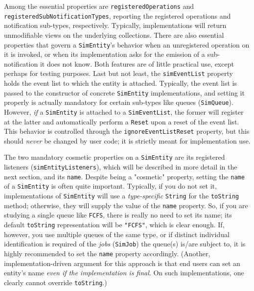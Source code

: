 Among the essential properties are
  \lstinline|registeredOperations|
  and
  \lstinline|registeredSubNotificationTypes|,
  reporting the registered operations and notification sub-types,
  respectively.
Typically,
  implementations will return unmodifiable views
  on the underlying collections.
There are also essential properties that govern a
  \lstinline|SimEntity|'s behavior when an
  unregistered operation on it is invoked,
  or when its implementation asks for the emission
  of a sub-notification it does not know.
Both features are of little practical use,
  except perhaps for testing purposes.
Last but not least,
  the \lstinline|simEventList| property holds
  the event list to which the entity is attached.
Typically,
  the event list is passed to the constructor
  of concrete \lstinline|SimEntity| implementations,
  and setting it properly is actually mandatory
  for certain sub-types
  like queues (\lstinline|SimQueue|).
However, {\em if\/} a \lstinline|SimEntity| is attached to a
  \lstinline|SimEventList|,
  the former will register at the latter
  and automatically perform a \lstinline|Reset|
  upon a reset of the event list.
This behavior
  is controlled through the \lstinline|ignoreEventListReset|
  property, but this should {\em never\/}
  be changed by user code; it is strictly meant for
  implementation use.
  
The two mandatory cosmetic properties on a \lstinline|SimEntity|
  are its registered listeners (\lstinline|simEntityListeners|),
  which will be described in more detail in the next section,
  and its \lstinline|name|.
Despite being a "cosmetic" property,
  setting the \lstinline|name|
  of a \lstinline|SimEntity|
  is often quite important.
Typically,
  if you do not set it,
  implementations of \lstinline|SimEntity|
  will use a {\em type-specific\/}
  \lstinline|String|
  for the \lstinline|toString| method;
  otherwise,
  they will supply the value of the \lstinline|name|
  property.
So,
  if you are studying a single queue like \lstinline|FCFS|,
  there is really no need to set its name;
  its default \lstinline|toString| representation
  will be \lstinline|"FCFS"|,
  which is clear enough.
If, however,
  you use multiple queues of the same type,
  or if distinct individual identification is required
  of the {\em jobs\/} (\lstinline|SimJob|)
  the queue(s) is/are subject to,
  it is highly recommended to set the
  \lstinline|name| property accordingly.
(Another, implementation-driven argument for this approach
  is that end users can set an entity's name
  {\em even if the implementation is final}.
On such implementations,
  one clearly cannot override \lstinline|toString|.)
  
